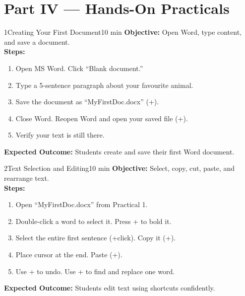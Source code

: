 \chapter{Part IV --- Hands-On Practicals}
\label{ch:lab4}


\begin{labactivity}{1}{Creating Your First Document}{10 min}
\textbf{Objective:} Open Word, type content, and save a document.\\[4pt]
\textbf{Steps:}
\begin{enumerate}[label=\protect\stepcircle{\arabic*}, leftmargin=2cm, itemsep=4pt]
  \item Open MS Word. Click ``Blank document.''
  \item Type a 5-sentence paragraph about your favourite animal.
  \item Save the document as ``MyFirstDoc.docx'' (+).
  \item Close Word. Reopen Word and open your saved file (+).
  \item Verify your text is still there.
\end{enumerate}
\textbf{Expected Outcome:} Students create and save their first Word document.
\welldone
\end{labactivity}

\begin{labactivity}{2}{Text Selection and Editing}{10 min}
\textbf{Objective:} Select, copy, cut, paste, and rearrange text.\\[4pt]
\textbf{Steps:}
\begin{enumerate}[label=\protect\stepcircle{\arabic*}, leftmargin=2cm, itemsep=4pt]
  \item Open ``MyFirstDoc.docx'' from Practical 1.
  \item Double-click a word to select it. Press + to bold it.
  \item Select the entire first sentence (+click). Copy it (+).
  \item Place cursor at the end. Paste (+).
  \item Use + to undo. Use + to find and replace one word.
\end{enumerate}
\textbf{Expected Outcome:} Students edit text using shortcuts confidently.
\welldone
\end{labactivity}


